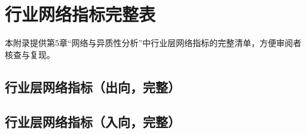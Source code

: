 \chapter{行业网络指标完整表}
\label{app:industry_network_full}

本附录提供第5章“网络与异质性分析”中行业层网络指标的完整清单，方便审阅者核查与复现。

\section{行业层网络指标（出向，完整）}
\label{app:industry_out_full}


\section{行业层网络指标（入向，完整）}
\label{app:industry_in_full}


